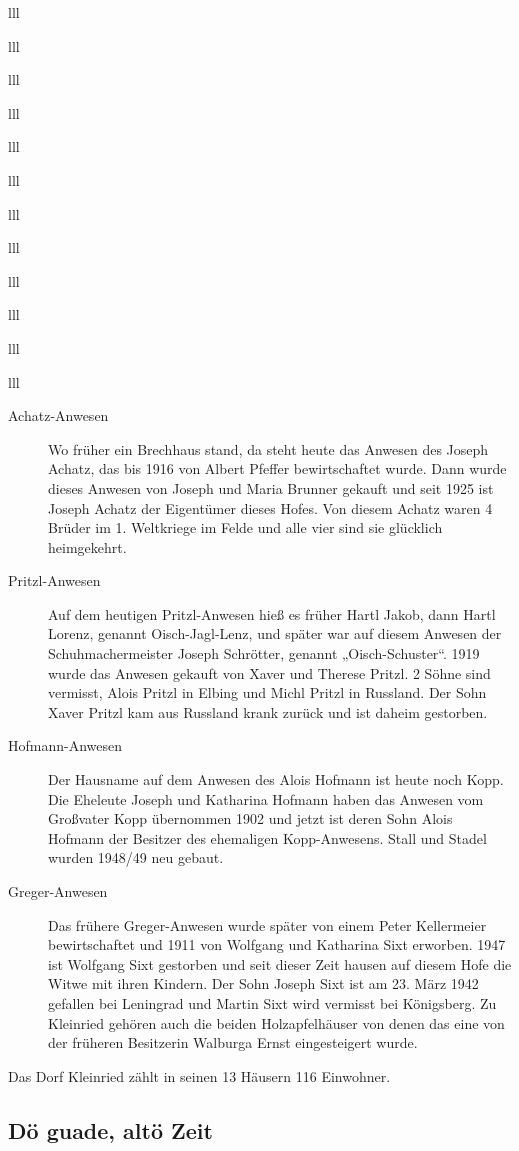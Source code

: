 \documentclass[12pt,a4pager]{book}
\begin{document}
\begin{tabuluar}{lll}
\begin{tabuluar}{lll}
\begin{tabuluar}{lll}
\begin{tabuluar}{lll}
\begin{tabuluar}{lll}
\begin{tabuluar}{lll}
\begin{tabuluar}{lll}
\begin{tabuluar}{lll}
\begin{tabuluar}{lll}
\begin{tabuluar}{lll}
\begin{tabuluar}{lll}
\begin{tabuluar}{lll}
\begin{description}
\item[Achatz-Anwesen] Wo früher ein Brechhaus stand, da steht heute das Anwesen
des Joseph Achatz, das bis 1916 von Albert Pfeffer bewirtschaftet wurde. Dann
wurde dieses Anwesen von Joseph und Maria Brunner gekauft und seit 1925 ist
Joseph Achatz der Eigentümer dieses Hofes. Von diesem Achatz waren 4 Brüder im
1. Weltkriege im Felde und alle vier sind sie glücklich heimgekehrt.

\item[Pritzl-Anwesen] Auf dem heutigen Pritzl-Anwesen hieß es früher Hartl
Jakob, dann Hartl Lorenz, genannt Oisch-Jagl-Lenz, und später war auf diesem
Anwesen der Schuhmachermeister Joseph Schrötter, genannt „Oisch-Schuster“. 1919
wurde das Anwesen gekauft von Xaver und Therese Pritzl. 2 Söhne sind vermisst,
Alois Pritzl in Elbing und Michl Pritzl in Russland. Der Sohn Xaver Pritzl kam
aus Russland krank zurück und ist daheim gestorben.

\item[Hofmann-Anwesen] Der Hausname auf dem Anwesen des Alois Hofmann ist heute
noch Kopp. Die Eheleute Joseph und Katharina Hofmann haben das Anwesen vom
Großvater Kopp übernommen 1902 und jetzt ist deren Sohn Alois Hofmann der
Besitzer des ehemaligen Kopp-Anwesens. Stall und Stadel wurden 1948/49 neu
gebaut.

\item[Greger-Anwesen] Das frühere Greger-Anwesen wurde später von einem Peter
Kellermeier bewirtschaftet und 1911 von Wolfgang und Katharina Sixt erworben.
1947 ist Wolfgang Sixt gestorben und seit dieser Zeit hausen auf diesem Hofe die
Witwe mit ihren Kindern. Der Sohn Joseph Sixt ist am 23. März 1942 gefallen bei
Leningrad und Martin Sixt wird vermisst bei Königsberg. Zu Kleinried gehören
auch die beiden Holzapfelhäuser von denen das eine von der früheren Besitzerin
Walburga Ernst eingesteigert wurde.
\end{description}

Das Dorf Kleinried zählt in seinen 13 Häusern 116 Einwohner.

\subsection{Dö guade, altö Zeit}


\end{tabuluar}
\end{tabuluar}
\end{tabuluar}
\end{tabuluar}
\end{tabuluar}
\end{tabuluar}
\end{tabuluar}
\end{tabuluar}
\end{tabuluar}
\end{tabuluar}
\end{tabuluar}
\end{tabuluar}
\end{document}
